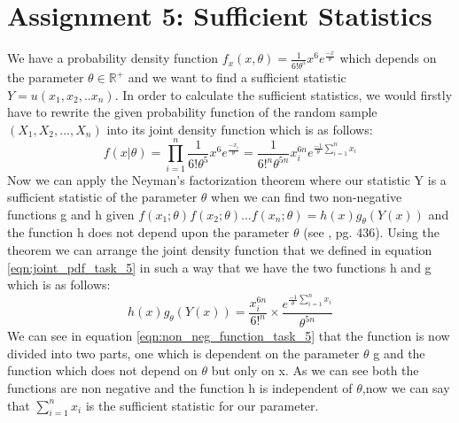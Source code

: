 \chapter{Assignment 5: Sufficient Statistics}
We have a probability density function $f_x(x,\theta) = \frac{1}{6! \theta^5}x^6e^{\frac{-x}{\theta}}$ which depends on the parameter $\theta \in \mathbb{R}^+$ and we want to find a sufficient statistic $Y=u(x_1, x_2,..x_n)$. In order to calculate the sufficient statistics, we would firstly have to rewrite the given probability function of the random sample $(X_1, X_2, ..., X_n)$ into its joint density function which is as follows:
\begin{equation} \label{eqn:joint_pdf_task_5}
        f(x|\theta) = \prod_{i=1}^{n} \frac{1}{6! \theta^5}x^6e^{\frac{-x_i}{\theta}} = \frac{1}{6!^n \theta^{5n}}x_i^{6n}e^{\frac{-1}{\theta} \sum_{i=1}^{n}x_i} 
\end{equation}
Now we can apply the Neyman's factorization theorem where our statistic Y is a sufficient statistic of the parameter $\theta$ when we can find two non-negative functions g and h given $f(x_1;\theta)f(x_2;\theta)...f(x_n;\theta)=h(x) g_{\theta}(Y(x))$ and the function h does not depend upon the parameter $\theta$ (see \cite{hogg:2005}, pg. 436). Using the theorem we can arrange the joint density function that we defined in equation \ref{eqn:joint_pdf_task_5} in such a way that we have the two functions h and g which is as follows:
\begin{equation} \label{eqn:non_neg_function_task_5}
   h(x) g_{\theta}(Y(x)) = \frac{x_i^{6n}}{6!^n} \times \frac{e^{\frac{-1}{\theta} \sum_{i=1}^{n}x_i}}{\theta^{5n}} 
\end{equation}\newline\newline
We can see in equation \ref{eqn:non_neg_function_task_5} that the function is now divided into two parts, one which is dependent on the parameter $\theta$ g and the function which does not depend on $\theta$ but only on x. As we can see both the functions are non negative and the function h is independent of $\theta$,now we can say that $\sum_{i=1}^{n}x_i$ is the sufficient statistic for our parameter. 